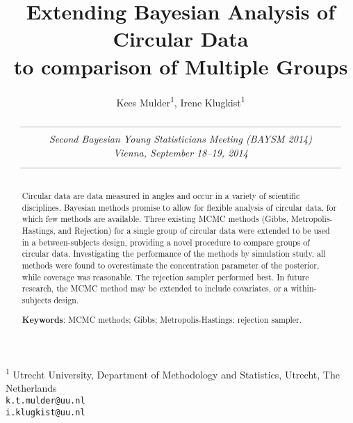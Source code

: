 \documentclass[11pt,a4paper]{article}
\begin{document}
\title{Extending Bayesian Analysis of Circular Data \\ to comparison of Multiple Groups }

\date{
\small{---------------------------------------------------------------------------------------------------
\\
\textit{Second Bayesian Young Statisticians Meeting (BAYSM 2014)\\
Vienna,  September 18--19, 2014}
\\[-.3em]
---------------------------------------------------------------------------------------------------}
}

\author{Kees Mulder\textsuperscript{1}, Irene Klugkist\textsuperscript{1}}

\maketitle

\begin{center}
 \vspace{-.5em}
 {\small \textsuperscript{1} Utrecht University, Department of Methodology and Statistics, Utrecht, The Netherlands\\[-.2em]
 {\tt k.t.mulder@uu.nl}
\\{\tt i.klugkist@uu.nl}}
 \vspace{.5em}
\end{center}

\vspace*{0.5em}

\begin{abstract}

Circular data are data measured in angles and occur in a variety of scientific disciplines. Bayesian methods promise to allow for flexible analysis of circular data, for which few methods are available. Three existing MCMC methods (Gibbs, Metropolis-Hastings, and Rejection) for a single group of circular data were extended to be used in a between-subjects design, providing a novel procedure to compare groups of circular data. Investigating the performance of the methods by simulation study, all methods were found to overestimate the concentration parameter of the posterior, while coverage was reasonable. The rejection sampler performed best. In future research, the MCMC method may be extended to include covariates, or a within-subjects design. 

\textbf{Keywords}: MCMC methods; Gibbs; Metropolis-Hastings; rejection sampler. 

\end{abstract}
\end{document}

